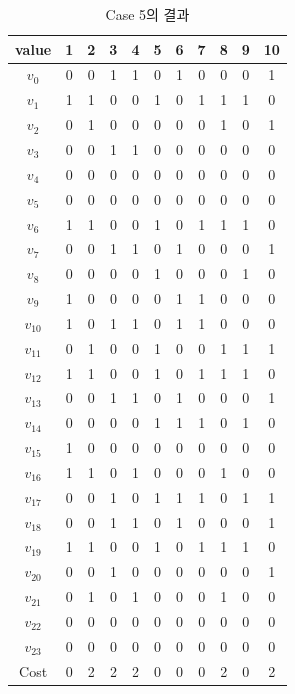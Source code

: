 \documentclass{article}
\begin{document}
    \begin{table}[htb!]
    \centering
    \begin{tabular}{c | c c c c c c c c c c}
        \hline
        value & 1 & 2 & 3 & 4 & 5 & 6 & 7 & 8 & 9 & 10 \\
        \hline
        $v_0$ & 0 & 0 & 1 & 1 & 0 & 1 & 0 & 0 & 0 & 1 \\
        $v_1$ & 1 & 1 & 0 & 0 & 1 & 0 & 1 & 1 & 1 & 0 \\
        $v_2$ & 0 & 1 & 0 & 0 & 0 & 0 & 0 & 1 & 0 & 1 \\
        $v_3$ & 0 & 0 & 1 & 1 & 0 & 0 & 0 & 0 & 0 & 0 \\
        $v_4$ & 0 & 0 & 0 & 0 & 0 & 0 & 0 & 0 & 0 & 0 \\
        $v_5$ & 0 & 0 & 0 & 0 & 0 & 0 & 0 & 0 & 0 & 0 \\
        $v_6$ & 1 & 1 & 0 & 0 & 1 & 0 & 1 & 1 & 1 & 0 \\
        $v_7$ & 0 & 0 & 1 & 1 & 0 & 1 & 0 & 0 & 0 & 1 \\
        $v_8$ & 0 & 0 & 0 & 0 & 1 & 0 & 0 & 0 & 1 & 0 \\
        $v_9$ & 1 & 0 & 0 & 0 & 0 & 1 & 1 & 0 & 0 & 0 \\
        $v_{10}$ & 1 & 0 & 1 & 1 & 0 & 1 & 1 & 0 & 0 & 0 \\
        $v_{11}$ & 0 & 1 & 0 & 0 & 1 & 0 & 0 & 1 & 1 & 1 \\
        $v_{12}$ & 1 & 1 & 0 & 0 & 1 & 0 & 1 & 1 & 1 & 0 \\
        $v_{13}$ & 0 & 0 & 1 & 1 & 0 & 1 & 0 & 0 & 0 & 1 \\
        $v_{14}$ & 0 & 0 & 0 & 0 & 1 & 1 & 1 & 0 & 1 & 0 \\
        $v_{15}$ & 1 & 0 & 0 & 0 & 0 & 0 & 0 & 0 & 0 & 0 \\
        $v_{16}$ & 1 & 1 & 0 & 1 & 0 & 0 & 0 & 1 & 0 & 0 \\
        $v_{17}$ & 0 & 0 & 1 & 0 & 1 & 1 & 1 & 0 & 1 & 1 \\
        $v_{18}$ & 0 & 0 & 1 & 1 & 0 & 1 & 0 & 0 & 0 & 1 \\
        $v_{19}$ & 1 & 1 & 0 & 0 & 1 & 0 & 1 & 1 & 1 & 0 \\
        $v_{20}$ & 0 & 0 & 1 & 0 & 0 & 0 & 0 & 0 & 0 & 1 \\
        $v_{21}$ & 0 & 1 & 0 & 1 & 0 & 0 & 0 & 1 & 0 & 0 \\
        $v_{22}$ & 0 & 0 & 0 & 0 & 0 & 0 & 0 & 0 & 0 & 0 \\
        $v_{23}$ & 0 & 0 & 0 & 0 & 0 & 0 & 0 & 0 & 0 & 0 \\
        \hline
        Cost & 0 & 2 & 2 & 2 & 0 & 0 & 0 & 2 & 0 & 2 \\
        \hline
    \end{tabular}
    \caption{Case 5의 결과}
    \label{tab:result5}
    \end{table}
\end{document}
